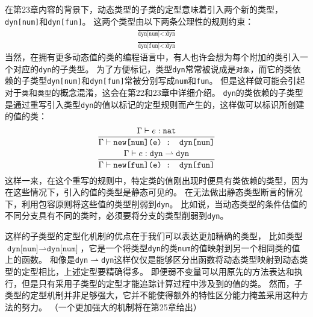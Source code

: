 在第23章内容的背景下，动态类型的子类的定型意味着引入两个新的类型，\texttt{dyn[num]}和\texttt{dyn[fun]}。
这两个类型由以下两条公理性的规则约束：
\begin{subequations}
    \begin{gather}
        \frac{}{\texttt{dyn[num]<:dyn}} \\
        \frac{}{\texttt{dyn[fun]<:dyn}}
    \end{gather}
\end{subequations}
当然，在拥有更多动态值的类的编程语言中，有人也许会想为每个附加的类引入一个对应的\texttt{dyn}的子类型。
为了方便标记，类型\texttt{dyn}常常被说成是\texttt{对象}，而它的类依赖的子类型\texttt{dyn[num]}和\texttt{dyn[fun]}常被分别写成\texttt{num}和\texttt{fun}。
但是这样做可能会引起对于\texttt{类}和\texttt{类型}的概念混淆，这会在第22和23章中详细介绍。
\texttt{dyn}的类依赖的子类型是通过重写引入类型\texttt{dyn}的值以标记的定型规则而产生的，这样做可以标识所创建的值的类：
\begin{subequations}
    \begin{gather}
        \frac{\Gamma \vdash e : \texttt{nat}}{\Gamma \vdash \texttt{new[num](e) : \texttt{dyn[num]}}} \\
        \frac{\Gamma \vdash e : \texttt{dyn} \rightharpoonup \texttt{dyn}}{\Gamma \vdash \texttt{new[fun](e) : \texttt{dyn[fun]}}}
    \end{gather}
\end{subequations}
这样一来，在这个重写的规则中，特定类的值刚出现时便具有类依赖的类型，因为在这些情况下，引入的值的类型是静态可见的。
在无法做出静态类型断言的情况下，利用包容原则将这些值的类型削弱到\texttt{dyn}。
比如说，当动态类型的条件估值的不同分支具有不同的类时，必须要将分支的类型削弱到\texttt{dyn}。

这样的子类型的定型化机制的优点在于我们可以表达更加精确的类型，
比如类型$\texttt{dyn[num]}\rightharpoonup\texttt{dyn[num]}$，它是一个将类型\texttt{dyn}的类\texttt{num}的值映射到另一个相同类的值上的函数。
和像是\texttt{dyn}$\rightharpoonup$\texttt{dyn}这样仅仅是能够区分出函数将动态类型映射到动态类型的定型相比，上述定型要精确得多。
即便弱不变量可以用原先的方法表达和执行，但是只有采用子类型的定型才能追踪计算过程中涉及到的值的类。
然而，子类型的定型机制并非足够强大，它并不能使得额外的特性区分能力掩盖采用这种方法的努力。
（一个更加强大的机制将在第25章给出）


